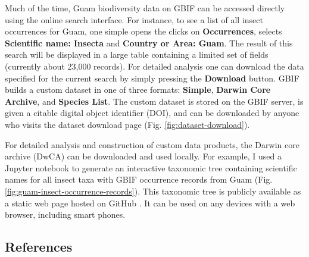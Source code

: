 \documentclass[12pt,letterpaper,english,bibliography=totocnumbered, abstract=on]{scrartcl}
\begin{document}
Much of the time, Guam biodiversity data on GBIF can be accessed directly using the online search interface. For instance, to see a list of all insect occurrences for Guam, one simple opens the clicks on \textbf{Occurrences}, selects \textbf{Scientific name: Insecta} and \textbf{Country or Area: Guam}. The result of this search will be displayed in a large table containing a limited set of fields (currently about 23,000 records). For detailed analysis one can download the data specified for the current search by simply pressing the \textbf{Download} button. GBIF builds a custom dataset in one of three formats: \textbf{Simple}, \textbf{Darwin Core Archive}, and \textbf{Species List}. The custom dataset is stored on the GBIF server, is given a citable digital object identifier (DOI), and can be downloaded by anyone who visits the dataset download page \cite{https://doi.org/10.15468/dl.yztrkr} (Fig. \ref{fig:dataset-download}).

For detailed analysis and construction of custom data products, the Darwin core archive (DwCA) can be downloaded and used locally. For example, I used a Jupyter notebook \cite{taxonview-ipynb} to generate an interactive taxonomic tree containing scientific names for all insect taxa with GBIF occurrence records from Guam (Fig. \ref{fig:guam-insect-occurrence-records}). This taxonomic tree is publicly available as a static web page hosted on GitHub \cite{taxonview-page}. It can be used on any devices with a web browser, including smart phones.


\subsection{References}
\printbibliography[heading=none]
\end{document}
